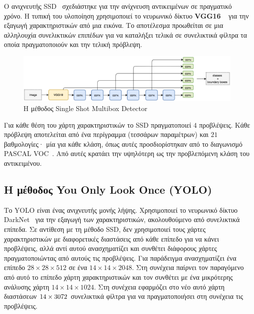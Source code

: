 Ο ανιχνευτής SSD~\cite{liu2016ssd} σχεδιάστηκε για την ανίχνευση αντικειμένων σε πραγματικό χρόνο.
Η τυπική του υλοποίηση χρησιμοποιεί το νευρωνικό δίκτυο \textbf{VGG16}
~\cite{DBLP:journals/corr/SimonyanZ14a} για την εξαγωγή χαρακτηριστικών
από μια εικόνα. Το αποτέλεσμα προωθείται σε μια αλληλουχία συνελικτικών επιπέδων
για να καταλήξει τελικά σε συνελικτικά φίλτρα τα οποία πραγματοποιούν και την
τελική πρόβλεψη.

\begin{figure}[htbp]
  \begin{center}
    \includegraphics[width=0.9\maxwidth]{../figures/ssd.png}
    \caption{Η μέθοδος Single Shot Multibox Detector\label{fig:ssd}}
   \end{center}
\end{figure}

Για κάθε θέση του χάρτη χαρακτηριστικών το SSD πραγματοποιεί $4$ προβλέψεις. Κάθε
πρόβλεψη αποτελείται από ένα περίγραμμα (τεσσάρων παραμέτρων) και $21$  βαθμολογίες·
μία για κάθε κλάση, όπως αυτές προσδιορίστηκαν από το διαγωνισμό PASCAL VOC~\cite{pascal-voc-2007}.
Από αυτές κρατάει την υψηλότερη ως την προβλεπόμενη κλάση του αντικειμένου.


\subsection{Η μέθοδος You Only Look Once (YOLO)}\label{sec:yolo}

Το YOLO είναι ένας ανιχνευτής μονής λήψης. Χρησιμοποιεί το νευρωνικό δίκτυο
DarkNet~\cite{darknet13} για την εξαγωγή των χαρακτηριστικών, ακολουθούμενο από
συνελικτικά επίπεδα. Σε αντίθεση με τη μέθοδο SSD, δεν χρησιμοποιεί τους χάρτες
χαρακτηριστικών με διαφορετικές διαστάσεις από κάθε επίπεδο για να κάνει προβλέψεις,
αλλά αντί αυτού ανασχηματίζει και συνθέτει διάφορους χάρτες πραγματοποιώντας από
αυτούς τις προβλέψεις. Για παράδειγμα ανασχηματίζει ένα επίπεδο $28 \times 28 \times 512$
σε ένα $14 \times 14 \times 2048$. Στη συνέχεια παίρνει τον παραγόμενο από αυτό το
επίπεδο χάρτη χαρακτηριστικών και τον συνθέτει με ένα μικρότερης ανάλυσης χάρτη
$14 \times 14 \times 1024$. Στη συνέχεια εφαρμόζει στο νέο αυτό χάρτη διαστάσεων
$14 \time 14 \times 3072$ συνελικτικά φίλτρα για να πραγματοποιήσει στη συνέχεια
τις προβλέψεις.

